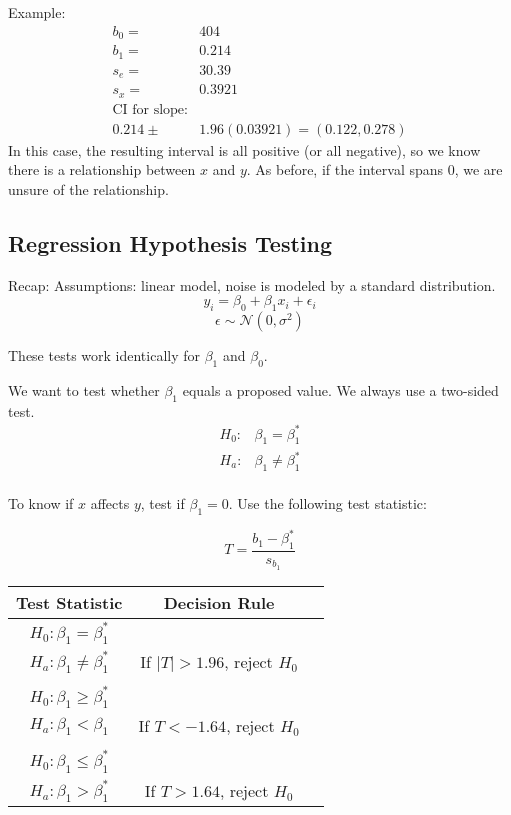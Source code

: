 \documentclass[11pt, oneside]{article}   	%
\begin{document}
Example:
\begin{align*}
b_0 =& 404\\
b_1 =& 0.214\\
s_e =& 30.39\\
s_x =& 0.3921\\
\text{CI for slope:}\\
0.214 \pm& 1.96(0.03921) = (0.122, 0.278)
\end{align*}
In this case, the resulting interval is all positive (or all negative), so we know there is a relationship between $x$ and $y$. As before, if the interval spans 0, we are unsure of the relationship.

\subsection{Regression Hypothesis Testing}

Recap:
Assumptions: linear model, noise is modeled by a standard distribution.
\[
y_i = \beta_0 + \beta_1 x_i + \epsilon_i
\]
\[
\epsilon \sim \mathcal{N}(0,\sigma^2)
\]

These tests work identically for $\beta_1$ and $\beta_0$.

We want to test whether $\beta_1$ equals a proposed value. We always use a two-sided test.
\begin{align*}
H_0 : & \beta_1 = \beta_1^*\\
H_a : & \beta_1 \neq \beta_1^*\\
\end{align*}

To know if $x$ affects $y$, test if $\beta_1 = 0$.  Use the following test statistic:

\[
T = \frac{b_1 - \beta_1^*} {s_{b_1}}
\]

 \begin{tabular}{ c  c c }
Test Statistic & Decision Rule \\
\hline
$H_0 : \beta_1 = \beta_1^*$ \\      $H_a : \beta_1 \neq \beta_1^*$ & If $|T| > 1.96$, reject $H_0$ \\
 & \\
$H_0 : \beta_1 \geq \beta_1^*$ \\ $H_a : \beta_1 < \beta_1$      & If $T < -1.64$, reject $H_0$ \\
 & \\
$H_0 : \beta_1 \leq \beta_1^*$ \\ $H_a : \beta_1 > \beta_1^*$      & If $T > 1.64$, reject $H_0$ \\
\end{tabular}
\end{document}
